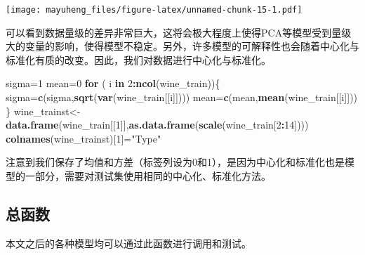 \documentclass[]{article}
\newenvironment{Shaded}{\begin{snugshade}}{\end{snugshade}}
\newcommand{\ControlFlowTok}[1]{\textcolor[rgb]{0.13,0.29,0.53}{\textbf{#1}}}
\newcommand{\DecValTok}[1]{\textcolor[rgb]{0.00,0.00,0.81}{#1}}
\newcommand{\KeywordTok}[1]{\textcolor[rgb]{0.13,0.29,0.53}{\textbf{#1}}}
\newcommand{\NormalTok}[1]{#1}
\newcommand{\OperatorTok}[1]{\textcolor[rgb]{0.81,0.36,0.00}{\textbf{#1}}}
\newcommand{\StringTok}[1]{\textcolor[rgb]{0.31,0.60,0.02}{#1}}
\begin{document}
\texttt{[image: mayuheng\_files/figure-latex/unnamed-chunk-15-1.pdf]}

可以看到数据量级的差异非常巨大，这将会极大程度上使得PCA等模型受到量级大的变量的影响，使得模型不稳定。另外，许多模型的可解释性也会随着中心化与标准化有质的改变。因此，我们对数据进行中心化与标准化。

\begin{Shaded}
\begin{Highlighting}[]
\NormalTok{sigma=}\DecValTok{1}
\NormalTok{mean=}\DecValTok{0}
\ControlFlowTok{for}\NormalTok{ ( i }\ControlFlowTok{in} \DecValTok{2}\OperatorTok{:}\KeywordTok{ncol}\NormalTok{(wine_train))\{}
\NormalTok{  sigma=}\KeywordTok{c}\NormalTok{(sigma,}\KeywordTok{sqrt}\NormalTok{(}\KeywordTok{var}\NormalTok{(wine_train[[i]])))}
\NormalTok{  mean=}\KeywordTok{c}\NormalTok{(mean,}\KeywordTok{mean}\NormalTok{(wine_train[[i]]))}
\NormalTok{\}}
\NormalTok{wine_trainst<-}\KeywordTok{data.frame}\NormalTok{(wine_train[[}\DecValTok{1}\NormalTok{]],}\KeywordTok{as.data.frame}\NormalTok{(}\KeywordTok{scale}\NormalTok{(wine_train[}\DecValTok{2}\OperatorTok{:}\DecValTok{14}\NormalTok{])))}
\KeywordTok{colnames}\NormalTok{(wine_trainst)[}\DecValTok{1}\NormalTok{]=}\StringTok{"Type"}
\end{Highlighting}
\end{Shaded}

注意到我们保存了均值和方差（标签列设为0和1），是因为中心化和标准化也是模型的一部分，需要对测试集使用相同的中心化、标准化方法。

\subsection{总函数}

本文之后的各种模型均可以通过此函数进行调用和测试。
\end{document}
